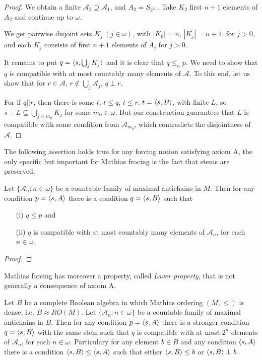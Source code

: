 \begin{proof}
We obtain a finite $\mathcal A_2 \supseteq \mathcal A_1$,
and $A_2 = S_{2^{2n}}$. Take $K_2$ first $n+1$ elements of
$A_2$ and continue up to $\omega$.

We get pairwise disjoint sets $K_j \ (j \in \omega)$, with $|K_0|=n$,
$|K_j|=n+1$, for $j > 0$, and each $K_j$ consists of first $n+1$
elements of $A_j$ for $j > 0$.

It remains to put $q = \langle s, \bigcup_j K_j\rangle$ and it is clear that
$q \leq_n p$. We need to show that $q$ is compatible with at most
countably many  elements of $\mathcal A$. To this end, let us show
that for $r \in \mathcal A$, $r \not \in \bigcup_j \mathcal A_j$,
$q \perp r$.

For if $q || r$, then there is some $t$, $t \leq q$, $t \leq r$.
$t = \langle s,B\rangle$, with finite $L$, so $s -L \subseteq \bigcup_{j < m_0} K_j$
for some $m_0 \in \omega$. But our construction guarantees that
$L$ is compatible with some condition from $\mathcal A_{m_0}$,
which contradicts the disjointness of $\mathcal A$.
\end{proof}

The following assertion holds true for any forcing notion satisfying axiom A,
the only specific but important for Mathias frocing  is the fact that
stems are preserved.

\begin{theorem}
 Let $\{\mathcal A_n : n \in \omega \}$ be a countable family of maximal antichains
in $M$. Then for any condition $p = \langle s,A\rangle$ there is a condition
$q = \langle s,B\rangle$ such that
\begin{itemize}
 \item[(i)] $q \leq p$ and
 \item[(ii)] $q$ is compatible with at most countably many elements of $\mathcal A_n$,
 for each $n \in \omega$.
\end{itemize}
\end{theorem}

\begin{proof}

\end{proof}

Mathias forcing has moreover a property, called \emph{Laver property}, that is not
generally a consequence of axiom A.

\begin{proposition}
 Let $B$ be a complete Boolean algebra in which Mathias ordering $(M,\leq)$ is dense,
 i.e. $B \approx RO(M)$. Let $\{\mathcal A_n : n \in \omega \}$ be a countable
family of maximal antichains in $B$. Then for any condition $p = \langle s,A\rangle$ there is a stronger condition
 $q = \langle s,B\rangle$ with the same stem such that $q$ is compatible with at most $2^n$ elements of $\mathcal A_n$,
for each $n \in \omega$. Particulary for any element $b \in B$ and any condition  $\langle s,A\rangle$
there is a condition $\langle s,B\rangle \leq \langle s,A\rangle$ such that either $\langle s,B\rangle \leq b$ or $\langle s,B\rangle \perp b$.
\end{proposition}

